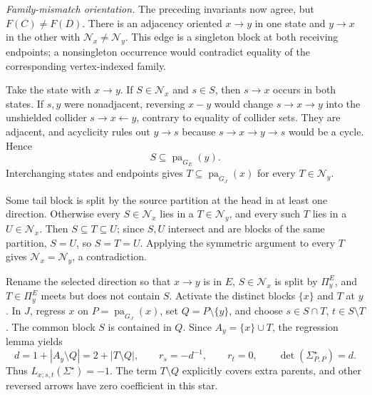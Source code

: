 \emph{Family-mismatch orientation.}
The preceding invariants now agree, but \(F(C)\ne F(D)\).  There is an adjacency oriented \(x\to y\) in one state and \(y\to x\) in the other with \(\mathcal N_x\ne\mathcal N_y\).  This edge is a singleton block at both receiving endpoints; a nonsingleton occurrence would contradict equality of the corresponding vertex-indexed family.

Take the state with \(x\to y\).  If \(S\in\mathcal N_x\) and \(s\in S\), then \(s\to x\) occurs in both states.  If \(s,y\) were nonadjacent, reversing \(x-y\) would change \(s\to x\to y\) into the unshielded collider \(s\to x\leftarrow y\), contrary to equality of collider sets.  They are adjacent, and acyclicity rules out \(y\to s\) because \(s\to x\to y\to s\) would be a cycle.  Hence
\[
 S\subseteq\operatorname{pa}_{G_E}(y).
\]
Interchanging states and endpoints gives \(T\subseteq\operatorname{pa}_{G_J}(x)\) for every \(T\in\mathcal N_y\).

Some tail block is split by the source partition at the head in at least one direction.  Otherwise every \(S\in\mathcal N_x\) lies in a \(T\in\mathcal N_y\), and every such \(T\) lies in a \(U\in\mathcal N_x\).  Then \(S\subseteq T\subseteq U\); since \(S,U\) intersect and are blocks of the same partition, \(S=U\), so \(S=T=U\).  Applying the symmetric argument to every \(T\) gives \(\mathcal N_x=\mathcal N_y\), a contradiction.

Rename the selected direction so that \(x\to y\) is in \(E\), \(S\in\mathcal N_x\) is split by \(\Pi^E_y\), and \(T\in\Pi^E_y\) meets but does not contain \(S\).  Activate the distinct blocks \(\{x\}\) and \(T\) at \(y\).  In \(J\), regress \(x\) on \(P=\operatorname{pa}_{G_J}(x)\), set \(Q=P\setminus\{y\}\), and choose \(s\in S\cap T\), \(t\in S\setminus T\).  The common block \(S\) is contained in \(Q\).  Since \(A_y=\{x\}\cup T\), the regression lemma yields
\[
 d=1+|A_y\setminus Q|=2+|T\setminus Q|,\qquad
 r_s=-d^{-1},\qquad r_t=0,\qquad
 \det(\Sigma^{\star}_{P,P})=d.
\]
Thus \(L_{x;s,t}(\Sigma^{\star})=-1\).  The term \(T\setminus Q\) explicitly covers extra parents, and other reversed arrows have zero coefficient in this star.

